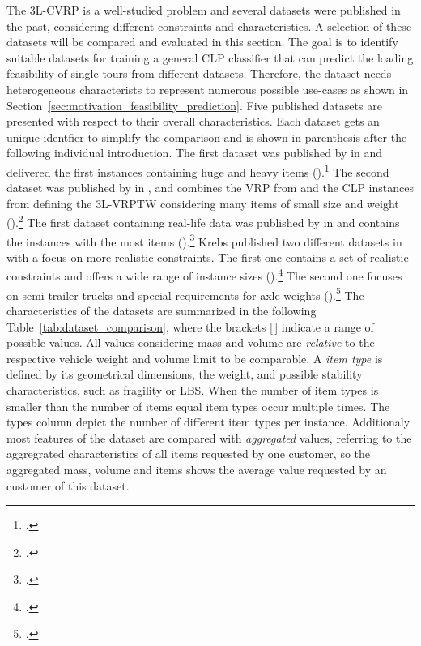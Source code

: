 The \gls{3L-CVRP} is a well-studied problem and several datasets were published in the past, considering
different constraints and characteristics. A selection of these datasets will be compared and evaluated
in this section. The goal is to identify suitable datasets for training a general \gls{CLP} classifier that can predict
the loading feasibility of single tours from different datasets. Therefore, the dataset needs
heterogeneous characterists to represent numerous possible use-cases
as shown in Section~\ref{sec:motivation_feasibility_prediction}. Five published
 datasets are presented with respect to their overall characteristics.
Each dataset gets an unique identfier to simplify the comparison and is shown in parenthesis
after the following individual introduction. The first  dataset was published by \citeauthor{gendreau_tabu_2006} in
\citeyear{gendreau_tabu_2006} and delivered the first  instances containing huge and heavy items (\gendreauDataSet).\footcite[cf.][]{gendreau_tabu_2006}
The second dataset was published by \citeauthor{moura_integrated_2009} in \citeyear{moura_integrated_2009},
and combines the \gls{VRP} from \citeauthor{solomon_algorithms_1987} and the \gls{CLP} instances from
\citeauthor{bischoff_issues_1995} defining the \gls{3L-VRPTW} considering
many items of small size and weight (\mouraDataSet).\footcites[cf.][]{solomon_algorithms_1987,bischoff_issues_1995}[][]{moura_integrated_2009}
The first dataset containing real-life data was published by \citeauthor{ceschia_local_2013} in \citeyear{ceschia_local_2013}
and contains the instances with the most items (\ceschiaDataSet).\footcite[cf.][]{ceschia_local_2013}
Krebs published two different datasets in
\citeyear{krebs_advanced_2021} with a focus on more realistic constraints. The first one contains a set
of realistic constraints and offers a wide range of instance sizes (\krebsADataSet).\footcite[cf.][]{krebs_advanced_2021}
The second one focuses on semi-trailer trucks and special requirements for axle weights (\krebsBDataSet).\footcite[cf.][]{krebs_axle_2021}
The characteristics of the datasets are summarized in the following Table~\ref{tab:dataset_comparison},
where the brackets [\,] indicate a range of possible values. All values considering mass and volume are
\textit{relative} to the respective vehicle weight and volume limit to be comparable. A \textit{item type} is
defined by its geometrical dimensions, the weight, and possible stability characteristics, such as fragility or \gls{LBS}.
When the number of item types is smaller than the number of items equal item types occur multiple times. The types column
depict the number of different item types per instance. Additionaly
most features of the dataset are compared with \textit{aggregated}  values, referring to the aggregrated characteristics
of all items requested by one customer, so the aggregated mass, volume and items shows the average value requested by an
customer of this dataset.

